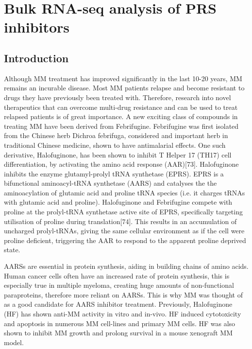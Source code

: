 \chapter{\label{ch:5-bulk}Bulk RNA-seq analysis of PRS inhibitors}


\section{Introduction}
Although MM treatment has improved significantly in the last 10-20 years, MM remains an incurable disease.
Most MM patients relapse and become resistant to drugs they have previously been treated with.
Therefore, research into novel therapeutics that can overcome multi-drug resistance and can be used to treat relapsed patients is of great importance.
A new exciting class of compounds in treating MM have been derived from Febrifugine.
Febrifugine was first isolated from the Chinese herb Dichroa febrifuga, considered and important herb in traditional Chinese medicine, shown to have antimalarial effects.
One such derivative, Halofuginone, has been shown to inhibit T Helper 17 (TH17) cell differentiation, by activating the amino acid response (AAR)[73]. Halofuginone inhibits the enzyme glutamyl-prolyl tRNA synthetase (EPRS).
EPRS is a bifunctional aminoacyl-tRNA synthetase (AARS) and catalyses the the aminoacylation of glutamic acid and proline tRNA species (i.e. it charges tRNAs with glutamic acid and proline).
Halofuginone and Febrifugine compete with proline at the prolyl-tRNA synthetase active site of EPRS, specifically targeting utilisation of proline during translation[74].
This results in an accumulation of uncharged prolyl-tRNAs, giving the same cellular environment as if the cell were proline deficient, triggering the AAR to respond to the apparent proline deprived state.

AARSs are essential in protein synthesis, aiding in building chains of amino acids.
Human cancer cells often have an increased rate of protein synthesis, this is especially true in multiple myeloma, creating huge amounts of non-functional paraproteins, therefore more reliant on AARSs. This is why MM was thought of as a good candidate for AARS inhibitor treatment.
Previously, Halofuginone (HF) has shown anti-MM activity in vitro and in-vivo.
HF induced cytotoxicity and apoptosis in numerous MM cell-lines and primary MM cells.
HF was also shown to inhibit MM growth and prolong survival in a mouse xenograft MM model\cite{leiba2012halofuginone}.

